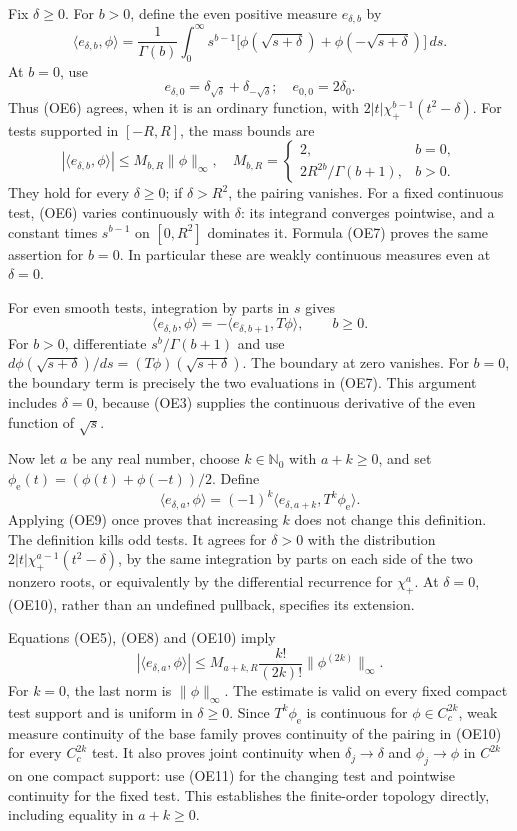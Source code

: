 \documentclass[
  11pt,
]{article}
\begin{document}
Fix \(\delta\geq0\). For \(b>0\), define the even positive measure
\(e_{\delta,b}\) by \[
 \langle e_{\delta,b},\phi\rangle
   =\frac1{\Gamma(b)}\int_0^\infty
       s^{b-1}\bigl[\phi(\sqrt{s+\delta})+
                         \phi(-\sqrt{s+\delta})\bigr] \,ds.
 \tag{OE6}
\] At \(b=0\), use \[
 e_{\delta,0}=\delta_{\sqrt\delta}+\delta_{-\sqrt\delta};
 \quad e_{0,0}=2\delta_0.
 \tag{OE7}
\] Thus (OE6) agrees, when it is an ordinary function, with
\(2|t|\chi_+^{b-1}(t^2-\delta)\). For tests supported in \([-R,R]\), the
mass bounds are \[
 |\langle e_{\delta,b},\phi\rangle|
 \leq M_{b,R}\|\phi\|_\infty,
 \quad
 M_{b,R}=
 \begin{cases}
 2,&b=0,\\
 2R^{2b}/\Gamma(b+1),&b>0.
 \end{cases}
 \tag{OE8}
\] They hold for every \(\delta\geq0\); if \(\delta>R^2\), the pairing
vanishes. For a fixed continuous test, (OE6) varies continuously with
\(\delta\): its integrand converges pointwise, and a constant times
\(s^{b-1}\) on \([0,R^2]\) dominates it. Formula (OE7) proves the same
assertion for \(b=0\). In particular these are weakly continuous
measures even at \(\delta=0\).

For even smooth tests, integration by parts in \(s\) gives \[
 \langle e_{\delta,b},\phi\rangle
       =-\langle e_{\delta,b+1},T\phi\rangle,
       \qquad b\geq0.
 \tag{OE9}
\] For \(b>0\), differentiate \(s^b/\Gamma(b+1)\) and use
\(d\phi(\sqrt{s+\delta})/ds=(T\phi)(\sqrt{s+\delta})\). The boundary at
zero vanishes. For \(b=0\), the boundary term is precisely the two
evaluations in (OE7). This argument includes \(\delta=0\), because (OE3)
supplies the continuous derivative of the even function of \(\sqrt s\).

Now let \(a\) be any real number, choose \(k\in\mathbb N_0\) with
\(a+k\geq0\), and set \(\phi_{\mathrm e}(t)=(\phi(t)+\phi(-t))/2\).
Define \[
 \langle e_{\delta,a},\phi\rangle
       =(-1)^k\langle e_{\delta,a+k},T^k\phi_{\mathrm e}\rangle.
 \tag{OE10}
\] Applying (OE9) once proves that increasing \(k\) does not change this
definition. The definition kills odd tests. It agrees for \(\delta>0\)
with the distribution \(2|t|\chi_+^{a-1}(t^2-\delta)\), by the same
integration by parts on each side of the two nonzero roots, or
equivalently by the differential recurrence for \(\chi_+^a\). At
\(\delta=0\), (OE10), rather than an undefined pullback, specifies its
extension.

Equations (OE5), (OE8) and (OE10) imply \[
 |\langle e_{\delta,a},\phi\rangle|
   \leq M_{a+k,R}\frac{k!}{(2k)!}
                    \|\phi^{(2k)}\|_\infty.
 \tag{OE11}
\] For \(k=0\), the last norm is \(\|\phi\|_\infty\). The estimate is
valid on every fixed compact test support and is uniform in
\(\delta\geq0\). Since \(T^k\phi_{\mathrm e}\) is continuous for
\(\phi\in C_c^{2k}\), weak measure continuity of the base family proves
continuity of the pairing in (OE10) for every \(C_c^{2k}\) test. It also
proves joint continuity when \(\delta_j\to\delta\) and \(\phi_j\to\phi\)
in \(C^{2k}\) on one compact support: use (OE11) for the changing test
and pointwise continuity for the fixed test. This establishes the
finite-order topology directly, including equality in \(a+k\geq0\).
\end{document}
